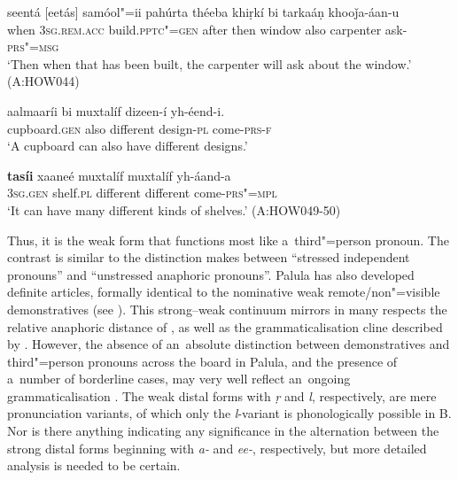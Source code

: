 \begin{exe}
\ex
\label{ex:5-16}
\gll seentá [eetás] samóol"=ii pahúrta théeba khiṛkí bi tarkaáṇ
khooǰa-áan-u  \\
when \textsc{3sg}.\textsc{rem.acc} build.\textsc{pptc"=gen} after then window also carpenter ask-\textsc{prs"=msg} \\
\glt `Then when that has been built, the carpenter will ask about the window.' (A:HOW044)
\end{exe}


\begin{exe}
\ex
\label{ex:5-17}
\gll aalmaaríi bi muxtalíf dizeen-í yh-éend-i. \\
cupboard.\textsc{gen} also different design-\textsc{pl} come-\textsc{prs-f} \\
\glt `A cupboard can also have different designs.' 

\gll \textbf{tasíi} xaaneé muxtalíf muxtalíf yh-áand-a \\
\textsc{3sg.gen} shelf.\textsc{pl} different different come-\textsc{prs"=mpl} \\
\glt `It can have many different kinds of shelves.' (A:HOW049-50)
\end{exe}

Thus, it is the weak form that functions most like a~third"=person pronoun. The contrast is similar to the distinction \citet[417--419]{givon2001a} makes between ``stressed independent pronouns'' and ``unstressed anaphoric pronouns''. Palula has also developed definite articles, formally identical to the nominative weak remote/non"=visible demonstratives (see ). This strong--weak continuum mirrors in many respects the relative anaphoric distance of \citet[419]{givon2001a}, as well as the grammaticalisation cline described by \citet[432]{diessel2006}. However, the absence of an~absolute distinction between demonstratives and third"=person pronouns across the board in Palula, and the presence of a~number of borderline cases, may very well reflect an~ongoing grammaticalisation \citep[213]{himmelmann1996}. The weak distal forms with \textit{ṛ} and \textit{l}, respectively, are mere pronunciation variants, of which only the \textit{l}-variant is phonologically possible in B. Nor is there anything indicating any significance in the alternation between the strong distal forms beginning with \textit{a-} and \textit{ee-}, respectively, but more detailed analysis is needed to be certain.



